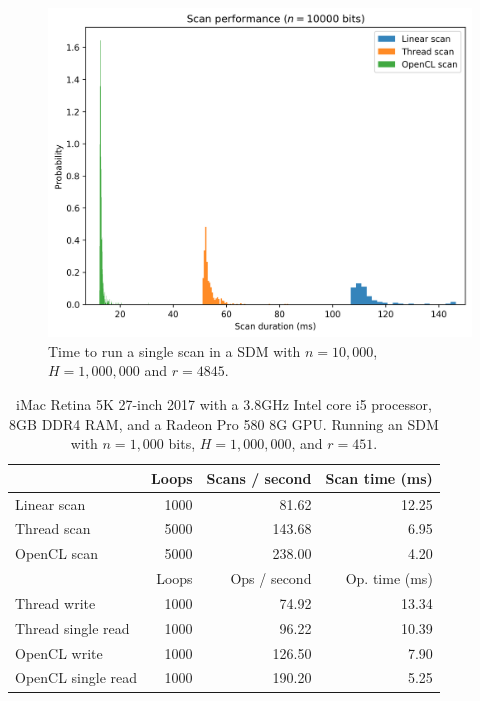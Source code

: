 \begin{figure}[!htb]
\centering\includegraphics[width=\textwidth]{images02/performance/imac-scans-10k.png}
\caption{Time to run a single scan in a SDM with $n=10,000$, $H=1,000,000$ and $r=4845$.
\label{fig:perf-imac-scan-10k}}
\end{figure}

\begin{table}[!htb]
\centering
\begin{tabular}{| l | r | r | r |}
    \hline
    & Loops & Scans / second & Scan time (ms) \\ \hline
    Linear scan & 1000 & 81.62 & 12.25 \\
    Thread scan & 5000 & 143.68 & 6.95 \\
    OpenCL scan & 5000 & 238.00 & 4.20 \\ \hline
    \hline
    & Loops & Ops / second & Op. time (ms) \\ \hline
    Thread write & 1000 & 74.92 & 13.34 \\
    Thread single read & 1000 & 96.22 & 10.39 \\
    OpenCL write & 1000 & 126.50 & 7.90 \\
    OpenCL single read & 1000 & 190.20 & 5.25 \\
    \hline
\end{tabular}
\caption{iMac Retina 5K 27-inch 2017 with a 3.8GHz Intel core i5 processor, 8GB DDR4 RAM, and a Radeon Pro 580 8G GPU. Running an SDM with $n=1,000$ bits, $H=1,000,000$, and $r=451$.
\label{tab:perf-imac-1000}}
\end{table}

